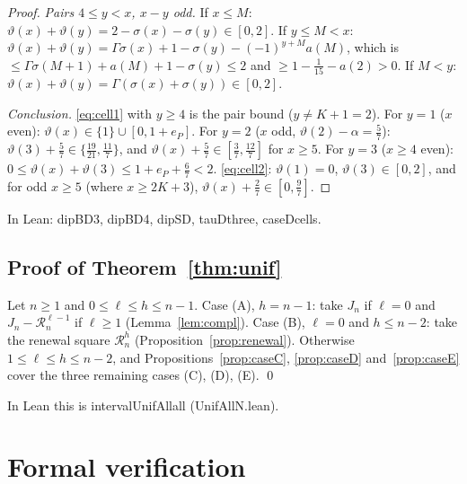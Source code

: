 \documentclass[11pt]{amsart}
\theoremstyle{definition}
\theoremstyle{remark}
\numberwithin{equation}{section}
\newcommand{\cR}{\mathcal{R}}
\newcommand{\leanus}{\textunderscore\allowbreak}
\newcommand{\lean}[1]{{\ttfamily\let\_\leanus #1}}
\begin{document}
\begin{proof}
\emph{Pairs $4\le y<x$, $x-y$ odd.} If $x\le M$: $\vartheta(x)+\vartheta(y)=2-\sigma(x)-\sigma(y)\in[0,2]$. If
$y\le M<x$: $\vartheta(x)+\vartheta(y)=\Gamma\sigma(x)+1-\sigma(y)-(-1)^{y+M}a(M)$, which is
$\le\Gamma\sigma(M+1)+a(M)+1-\sigma(y)\le2$ and $\ge1-\frac1{15}-a(2)>0$. If $M<y$:
$\vartheta(x)+\vartheta(y)=\Gamma(\sigma(x)+\sigma(y))\in[0,2]$.

\emph{Conclusion.} \eqref{eq:cell1} with $y\ge4$ is the pair bound ($y\ne K+1=2$). For $y=1$ ($x$ even):
$\vartheta(x)\in\{1\}\cup[0,1+e_P]$. For $y=2$ ($x$ odd, $\vartheta(2)-\alpha=\frac57$):
$\vartheta(3)+\frac57\in\{\frac{19}{21},\frac{11}7\}$, and $\vartheta(x)+\frac57\in[\frac37,\frac{12}7]$ for
$x\ge5$. For $y=3$ ($x\ge4$ even): $0\le\vartheta(x)+\vartheta(3)\le1+e_P+\frac67<2$. \eqref{eq:cell2}:
$\vartheta(1)=0$, $\vartheta(3)\in[0,2]$, and for odd $x\ge5$ (where $x\ge2K+3$),
$\vartheta(x)+\frac27\in[0,\frac97]$.
\end{proof}

In Lean: \lean{dipB\_D3}, \lean{dipB\_D4}, \lean{dipS\_D}, \lean{tauD\_three}, \lean{caseD\_cells}.

\subsection{Proof of \texorpdfstring{Theorem~\ref{thm:unif}}{Theorem 3}}\label{sec:proofunif}
Let $n\ge1$ and $0\le\ell\le h\le n-1$. Case (A), $h=n-1$: take $J_n$ if $\ell=0$ and
$J_n-\cR^{\ell-1}_n$ if $\ell\ge1$ (Lemma~\ref{lem:compl}). Case (B), $\ell=0$ and $h\le n-2$: take the
renewal square $\cR^h_n$ (Proposition~\ref{prop:renewal}). Otherwise $1\le\ell\le h\le n-2$, and
Propositions~\ref{prop:caseC}, \ref{prop:caseD} and~\ref{prop:caseE} cover the three remaining cases
(C), (D), (E). \qed

In Lean this is \lean{intervalUnifAll\_all} (\lean{UnifAllN.lean}).

\section{Formal verification}\label{sec:lean}
\end{document}
